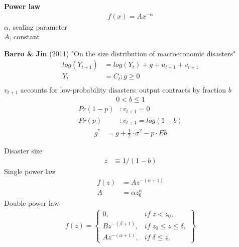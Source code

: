 \documentclass{beamer}
\begin{document}
\begin{frame}
  \textbf{Power law}
  \begin{align}
    f(x)=Ax^{-\alpha}
  \end{align}
  \medskip
  $\alpha$, scaling parameter\\
  $A$, constant
\end{frame}

\begin{frame}
 \textbf{Barro \& Jin} (2011) "On the size distribution of macroeconomic disasters"
 \begin{align}
   log(Y_{t+1}) &= log(Y_t)+g+u_{t+1}+v_{t+1}\\ \nonumber
   Y_t&=C_t; g \geq 0 \\
 \end{align}
 $v_{t+1}$ accounts for low-probability disasters: output contracts by fraction $b$
 \begin{align}
   0 < b \leq 1
 \end{align}
 \begin{align}
   Pr(1-p) &: v_{t+1}=0\\ \nonumber
   Pr(p) &: v_{t+1} =log(1-b)
 \end{align}
 \begin{align}
   g^* &= g+ \frac{1}{2}\cdot\sigma^2 -p\cdot Eb
 \end{align}
\end{frame}

\begin{frame}
  Disaster size
  \begin{align}
    z &\equiv 1/(1-b)
  \end{align}
  \medskip
  Single power law
  \begin{align}
    f(z) &= Az^{-(\alpha+1)}\\
    A&=\alpha z_0^{\alpha}    
  \end{align}
  \medskip
  Double power law
  \begin{align}
    f(z) = \begin{Bmatrix}
      0, & if\; z<z_0,\\
      Bz^{-(\beta+1)}, & if\; z_0 \leq z \leq \delta,\\
      Az^{-(\alpha+1)}, &if\; \delta \leq z, 
    \end{Bmatrix}
  \end{align}
\end{frame}
\end{document}
